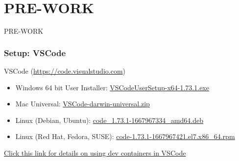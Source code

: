 \documentclass[aspectratio=169]{beamer}
\begin{document}
\section{PRE-WORK}
\begin{frame}
	\Huge \textcolor{dgreen}{PRE-WORK}
\end{frame}


\begin{frame}
	\frametitle{Setup: VSCode}
	VSCode (\href{https://code.visualstudio.com}{https://code.visualstudio.com})
	\begin{itemize}
		\item Windows 64 bit User Installer: \href{https://prereqs.codemash.org/Files/VVSCodeUserSetup-x64-1.73.1.exe}{VSCodeUserSetup-x64-1.73.1.exe}
		\item Mac Universal: \href{https://prereqs.codemash.org/Files/VSCode-darwin-universal.zip}{VSCode-darwin-universal.zip}
		\item Linux (Debian, Ubuntu): \href{https://prereqs.codemash.org/Files/code_1.73.1-1667967334_amd64.deb}{code\_1.73.1-1667967334\_amd64.deb}
		\item  Linux (Red Hat, Fedora, SUSE): \href{https://prereqs.codemash.org/Files/code-1.73.1-1667967421.el7.x86_64.rpm}{code-1.73.1-1667967421.el7.x86\_64.rpm}
	\end{itemize}
	\vspace{2mm}
	\href{https://code.visualstudio.com/docs/devcontainers/containers}{Click this link for details on using dev containers in VSCode}
\end{frame}
\end{document}
